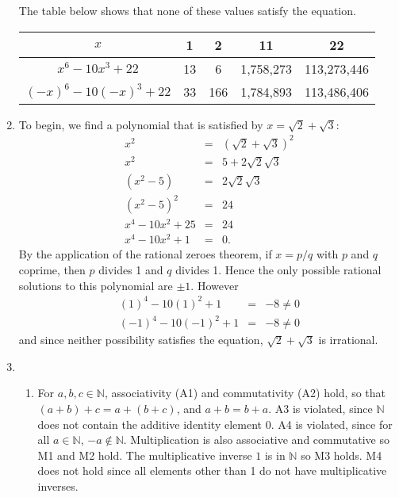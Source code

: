 \documentclass[12pt,letterpaper]{article}
\newcommand{\N}{\mathbb{N}}
\begin{document}
\begin{enumerate}
    The table below shows that none of these values satisfy the equation.
    \begin{center}
      \begin{tabular}{c|c|c|c|c}
	$x$ & 1 & 2 & 11 & 22 \\
	\hline
	$x^6-10x^3+22$ & 13 & 6 & 1,758,273 & 113,273,446 \\
	$(-x)^6-10(-x)^3+22$ & 33 & 166 & 1,784,893 & 113,486,406 \\
      \end{tabular}
    \end{center}
  \item To begin, we find a polynomial that is satisfied by $x=\sqrt{2} +
    \sqrt{3}$:
    \begin{eqnarray*}
      x^2 &=& (\sqrt{2}+\sqrt{3})^2 \\
      x^2 &=& 5+ 2\sqrt{2}\sqrt{3} \\
      (x^2-5) &=& 2\sqrt{2}\sqrt{3} \\
      (x^2-5)^2 &=& 24 \\
      x^4-10x^2 + 25 &=& 24 \\
      x^4-10x^2 + 1 &=& 0.
    \end{eqnarray*}
    By the application of the rational zeroes theorem, if $x=p/q$ with $p$ and
    $q$ coprime, then $p$ divides 1 and $q$ divides 1. Hence the only possible
    rational solutions to this polynomial are $\pm 1$. However
    \begin{eqnarray*}
      (1)^4 - 10(1)^2 + 1 &=& -8 \ne 0 \\
      (-1)^4 - 10 (-1)^2 +1 &=& -8 \ne 0
    \end{eqnarray*}
    and since neither possibility satisfies the equation, $\sqrt{2} + \sqrt{3}$
    is irrational.
  \item
    \begin{enumerate}
      \item For $a,b,c\in \N$, associativity (A1) and commutativity (A2) hold,
	so that $(a+b)+c = a+(b+c)$, and $a+b=b+a$. A3 is violated, since
	$\N$ does not contain the additive identity element $0$. A4 is violated,
	since for all $a\in \N$, $-a\notin \N$. Multiplication is also associative
	and commutative so M1 and M2 hold. The multiplicative inverse $1$ is in $\N$
	so M3 holds. M4 does not hold since all elements other than 1 do not
	have multiplicative inverses.


\end{enumerate}
\end{enumerate}
\end{document}
